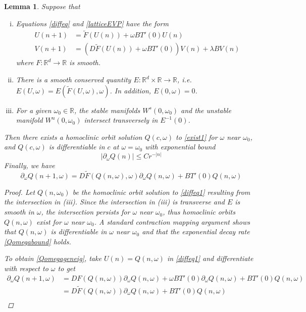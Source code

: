 \documentclass[12pt]{article}
\def\R{{\mathbb R}}
\newtheorem{lemma}{Lemma}
\begin{document}
\begin{lemma}\label{geneigcriteria}
Suppose that
\begin{enumerate}[(i)]
\item Equations \eqref{diffeq} and \eqref{latticeEVP} have the form
\begin{align}
U(n+1) &= \tilde{F}(U(n)) + \omega B T'(0) U(n) \label{diffeq1} \\
V(n+1) &= (D\tilde{F}(U(n)) + \omega B T'(0)) V(n) + \lambda B V(n) \label{latticeEVP1}
\end{align}
where $F: \R^d \rightarrow \R$ is smooth.
\item There is a smooth conserved quantity $E: \R^d \times \R \rightarrow \R$, i.e. $E(U, \omega) = E(\tilde{F}(U, \omega), \omega)$. In addition, $E(0, \omega) = 0$.  
\item For a given $\omega_0 \in \R$, the stable manifolds $W^s(0, \omega_0)$ and the unstable manifold $W^u(0, \omega_0)$ intersect transversely in $E^{-1}(0)$. 
\end{enumerate}
Then there exists a homoclinic orbit solution $Q(c, \omega)$ to \eqref{exist1} for $\omega$ near $\omega_0$, and $Q(c, \omega)$ is differentiable in $c$ at $\omega = \omega_0$ with exponential bound
\begin{equation}\label{Qomegabound}
|\partial_\omega Q(n)| \leq C r^{-|n|}
\end{equation}
Finally, we have
\begin{equation}\label{Qomegageneig}
\partial_\omega Q(n+1, \omega) = D\tilde{F}(Q(n, \omega), \omega)\partial_\omega Q(n, \omega)+ B T'(0)Q(n, \omega)
\end{equation}

\begin{proof}
Let $Q(n, \omega_0)$ be the homoclinic orbit solution to \eqref{diffeq1} resulting from the intersection in (iii). Since the intersection in (iii) is transverse and $E$ is smooth in $\omega$, the intersection persists for $\omega$ near $\omega_0$, thus homoclinic orbits $Q(n, \omega)$ exist for $\omega$ near $\omega_0$. A standard contraction mapping argument shows that $Q(n, \omega)$ is differentiable in $\omega$ near $\omega_0$ and that the exponential decay rate \eqref{Qomegabound} holds.

To obtain \eqref{Qomegageneig}, take $U(n) = Q(n, \omega)$ in \eqref{diffeq1} and differentiate with respect to $\omega$ to get
\begin{align*}
\partial_\omega Q(n+1, \omega) &=
DF(Q(n, \omega))\partial_\omega Q(n, \omega) + \omega B T'(0) \partial_\omega Q(n, \omega) + B T'(0) Q(n, \omega) \\
&= D\tilde{F}(Q(n, \omega))\partial_\omega Q(n, \omega) + B T'(0) Q(n, \omega) \\
\end{align*}
\end{proof}
\end{lemma}
\end{document}
